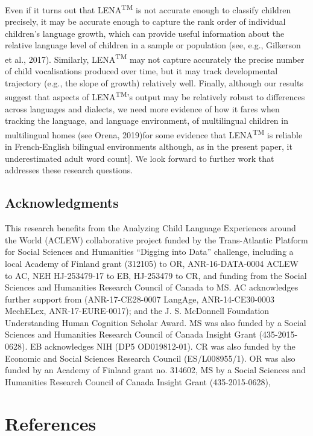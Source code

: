 \documentclass[english,table,man,floatsintext]{apa6}
\begin{document}
Even if it turns out that LENA\textsuperscript{TM} is not accurate enough to classify children precisely, it may be accurate enough to capture the rank order of individual children's language growth, which can provide useful information about the relative language level of children in a sample or population (see, e.g., Gilkerson et al., 2017). Similarly, LENA\textsuperscript{TM} may not capture accurately the precise number of child vocalisations produced over time, but it may track developmental trajectory (e.g., the slope of growth) relatively well. Finally, although our results suggest that aspects of LENA\textsuperscript{TM}'s output may be relatively robust to differences across languages and dialects, we need more evidence of how it fares when tracking the language, and language environment, of multilingual children in multilingual homes (see Orena, 2019)for some evidence that LENA\textsuperscript{TM} is reliable in French-English bilingual environments although, as in the present paper, it underestimated adult word count{]}. We look forward to further work that addresses these research questions.

\hypertarget{acknowledgments}{%
\subsection{Acknowledgments}\label{acknowledgments}}

This research benefits from the Analyzing Child Language Experiences around the World (ACLEW) collaborative project funded by the Trans-Atlantic Platform for Social Sciences and Humanities \enquote{Digging into Data} challenge, including a local Academy of Finland grant (312105) to OR, ANR-16-DATA-0004 ACLEW to AC, NEH HJ-253479-17 to EB, HJ-253479 to CR, and funding from the Social Sciences and Humanities Research Council of Canada to MS. AC acknowledges further support from (ANR-17-CE28-0007 LangAge, ANR-14-CE30-0003 MechELex, ANR-17-EURE-0017); and the J. S. McDonnell Foundation Understanding Human Cognition Scholar Award. MS was also funded by a Social Sciences and Humanities Research Council of Canada Insight Grant (435-2015-0628). EB acknowledges NIH (DP5 OD019812-01). CR was also funded by the Economic and Social Sciences Research Council (ES/L008955/1). OR was also funded by an Academy of Finland grant no. 314602, MS by a Social Sciences and Humanities Research Council of Canada Insight Grant (435-2015-0628),

\newpage

\hypertarget{references}{%
\section{References}\label{references}}
\end{document}
